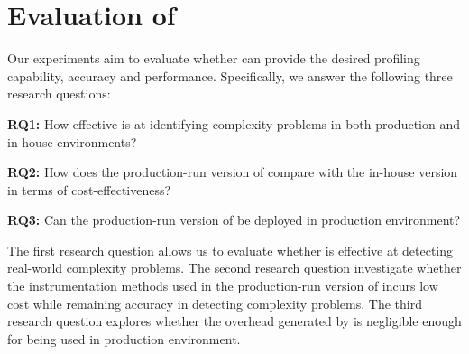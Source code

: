 \section{Evaluation of \Tool}
\label{sec:eva}



Our experiments aim to evaluate whether \Tool 
can provide the desired profiling capability, accuracy and performance. 
Specifically, we answer the following three research questions:


\vspace*{3pt}
\noindent
 {\bf RQ1:} 
How effective is \Tool at identifying complexity problems
in both production and in-house environments?

\vspace*{3pt}
\noindent
{\bf RQ2:}
How does the production-run version of \Tool 
compare with the in-house version in terms of
cost-effectiveness?

\vspace*{3pt}
\noindent
{\bf RQ3:}
Can the production-run version of \Tool be deployed
in production environment?







\vspace*{2pt}


The first research question allows us to evaluate whether \Tool is effective 
at detecting real-world complexity problems. 
The second research question investigate whether the instrumentation methods 
used in the production-run version of \Tool incurs low cost while remaining
accuracy in detecting complexity problems. 
The third research question explores whether the overhead generated 
by \Tool is negligible enough for being used in production environment.



